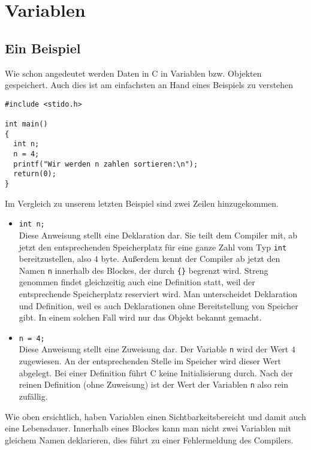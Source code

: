 \section{Variablen}


\subsection{Ein Beispiel}

Wie schon angedeutet werden Daten in C in Variablen bzw. Objekten gespeichert.
Auch dies ist am einfachsten an Hand eines Beispiels zu verstehen
\begin{lstlisting}[caption={Erste Variablendeklaration und -zuweisung}, belowcaptionskip=0.3em]
#include <stido.h>

int main()
{
  int n;
  n = 4;
  printf("Wir werden n zahlen sortieren:\n");
  return(0);
}
\end{lstlisting}
Im Vergleich zu unserem letzten Beispiel sind zwei Zeilen hinzugekommen. 
\begin{itemize}
\item \texttt{int n;}\\
  Diese Anweisung stellt eine Deklaration dar.
  Sie teilt dem Compiler mit, ab jetzt den entsprechenden Speicherplatz für eine ganze Zahl vom Typ \texttt{int} bereitzustellen, also $4$ byte.
  Außerdem kennt der Compiler ab jetzt den Namen \texttt{n} innerhalb des Blockes, der durch \texttt{\{\}} begrenzt wird.
  Streng genommen findet gleichzeitig auch eine Definition statt, weil der entsprechende Speicherplatz reserviert wird. 
  Man unterscheidet Deklaration und Definition, weil es auch Deklarationen ohne Bereitstellung von Speicher gibt.
  In einem solchen Fall wird nur das Objekt bekannt gemacht.

\item \verb|n = 4;|\\
  Diese Anweisung stellt eine Zuweisung dar.
  Der Variable \texttt{n} wird der Wert $4$ zugewiesen.
  An der entsprechenden Stelle im Speicher wird dieser Wert abgelegt.
  Bei einer Definition führt C keine Initialisierung durch.
  Nach der reinen Definition (ohne Zuweisung) ist der Wert der Variablen \texttt{n} also rein zufällig.
\end{itemize}
Wie oben ersichtlich, haben Variablen einen Sichtbarkeitsbereicht und damit auch eine Lebensdauer.
Innerhalb eines Blockes kann man nicht zwei Variablen mit gleichem Namen deklarieren, dies führt zu einer Fehlermeldung des Compilers.
